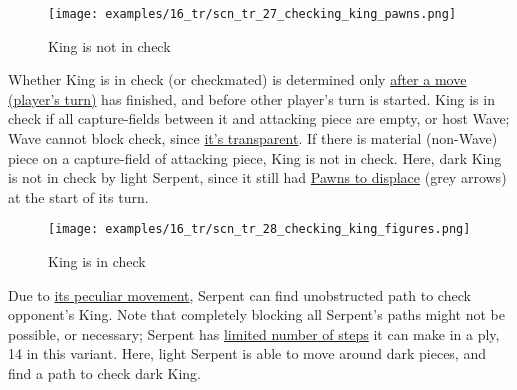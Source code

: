 \vspace*{-0.7\baselineskip}
\noindent
\begin{wrapfigure}[15]{l}{0.4\textwidth}
\centering
\texttt{[image: examples/16\_tr/scn\_tr\_27\_checking\_king\_pawns.png]}
\vspace*{-0.7\baselineskip}
\caption{King is not in check}
\label{fig:scn_tr_27_checking_king_pawns}
\end{wrapfigure}
Whether King is in check (or checkmated) is determined only
\hyperref[fig:scn_mv_051_cascaded_piece_check_init]{after a move (player's turn)}
has finished, and before other player's turn is started.\newline
\indent
King is in check if all capture-fields between it and attacking piece are empty,
or host Wave; Wave cannot block check, since
\hyperref[fig:scn_mv_011_wave_is_transparent]{it's transparent}. If there is material
(non-Wave) piece on a capture-field of attacking piece, King is not in check.\newline
\indent
Here, dark King is not in check by light Serpent, since it still had
\hyperref[fig:scn_tr_19_displacement_init]{Pawns to displace} (grey arrows) at
the start of its turn.

\noindent
\begin{wrapfigure}[16]{l}{0.4\textwidth}
\centering
\texttt{[image: examples/16\_tr/scn\_tr\_28\_checking\_king\_figures.png]}
\vspace*{-0.7\baselineskip}
\caption{King is in check}
\label{fig:scn_tr_28_checking_king_figures}
\end{wrapfigure}
Due to \hyperref[fig:scn_tr_01_serpent_diagonals]{its peculiar movement},
Serpent can find unobstructed path to check opponent's King.\newline
\indent
Note that completely blocking all Serpent's paths might not be possible, or
necessary; Serpent has \hyperref[fig:scn_tr_05_serpent_end]{limited number of steps}
it can make in a ply, 14 in this variant.\newline
\indent
Here, light Serpent is able to move around dark pieces, and find a path to check
dark King.

\clearpage %

